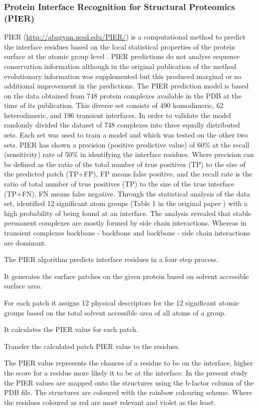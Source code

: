 			\subsubsection{Protein Interface Recognition for Structural Proteomics (PIER)}
			\label{sec:PIER}
			PIER (\url{http://abagyan.ucsd.edu/PIER/})  is a computational method to predict the interface residues based on the local statistical properties of the protein surface at the atomic group level \parencite{Kufareva2007}. PIER predictions do not analyse sequence conservation information although in the original publication of the method evolutionary information was supplemented but this produced marginal or no additional improvement in the predictions. The PIER prediction model is based on the data obtained from 748 protein complexes available in the PDB at the time of its publication. This diverse set consists of 490 homodimeric, 62 heterodimeric, and 196 transient interfaces. In order to validate the model \textcite{Kufareva2007} randomly divided the dataset of 748 complexes into three equally distributed sets. Each set was used to train a model and which was tested on the other two sets. PIER has shown a precision (positive predictive value) of 60\% at the recall (sensitivity) rate of 50\% in identifying the interface residues. Where precision can be defined as the ratio of the total number of true positives (TP) to the size of the predicted patch (TP+FP), FP means false positive, and the recall rate is the ratio of total number of true positives (TP) to the size of the true interface (TP+FN), FN means false negative. Through the statistical analysis of the data set, \textcite{Kufareva2007} identified 12 significant atom groups (Table 1 in the original paper \parencite{Kufareva2007}) with a high probability of being found at an interface.  The analysis revealed that stable permanent complexes are mostly formed by side chain interactions. Whereas in transient complexes backbone - backbone and backbone - side chain interactions are dominant. 
			
			The PIER algorithm predicts interface residues in a four step process. 
			\begin{inparaenum}
			\item It generates the surface patches on the given protein based on solvent accessible surface area. 
			\item For each patch it assigns 12 physical descriptors for the 12 significant atomic groups based on the total solvent accessible area of all atoms of a group. 
			\item It calculates the PIER value for each patch. 
			\item Transfer the calculated patch PIER value to the residues. 
			\end{inparaenum}
			The PIER value represents the chances of a residue to be on the interface, higher the score for a residue more likely it to be at the interface. In the present study the PIER values are mapped onto the structures using the b-factor column of the PDB file. The structures are coloured with the rainbow colouring scheme. Where the residues coloured as red are most relevant and violet as the least. 
		
